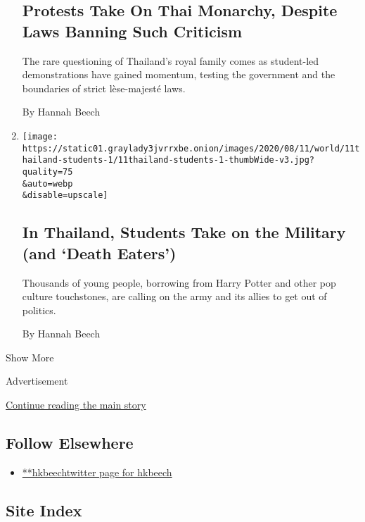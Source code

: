 \begin{enumerate}
{  \subsection{Protests Take On Thai Monarchy, Despite Laws Banning Such
  Criticism}\label{protests-take-on-thai-monarchy-despite-laws-banning-such-criticism}}

  The rare questioning of Thailand's royal family comes as student-led
  demonstrations have gained momentum, testing the government and the
  boundaries of strict lèse-majesté laws.

  By Hannah Beech
\item
  \href{/2020/08/11/world/asia/thailand-student-protest-military.html}{}

  \texttt{[image: https://static01.graylady3jvrrxbe.onion/images/2020/08/11/world/11thailand-students-1/11thailand-students-1-thumbWide-v3.jpg?quality=75\\\&auto=webp\\\&disable=upscale]}

  \hypertarget{in-thailand-students-take-on-the-military-and-death-eaters}{%
  \subsection{In Thailand, Students Take on the Military (and `Death
  Eaters')}\label{in-thailand-students-take-on-the-military-and-death-eaters}}

  Thousands of young people, borrowing from Harry Potter and other pop
  culture touchstones, are calling on the army and its allies to get out
  of politics.

  By Hannah Beech
\end{enumerate}

Show More

Advertisement

\protect\hyperlink{after-mid2}{Continue reading the main story}

\hypertarget{follow-elsewhere}{%
\subsection{Follow Elsewhere}\label{follow-elsewhere}}

\begin{itemize}
\tightlist
\item
  \href{https://twitter.com/hkbeech}{**hkbeechtwitter page for hkbeech}
\end{itemize}

\hypertarget{site-index}{%
\subsection{Site Index}\label{site-index}}

